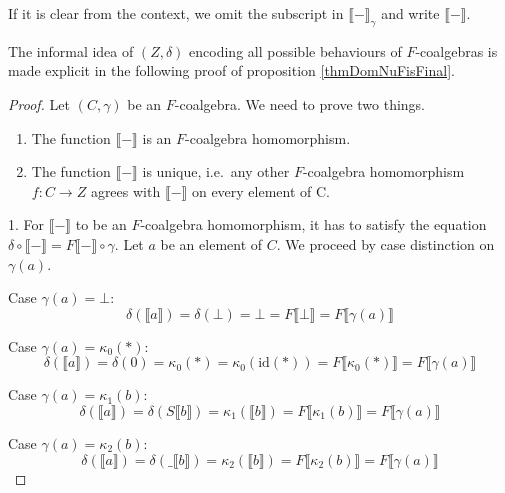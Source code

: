 \documentclass[a4paper]{article}
\newcommand{\arr}{\rightarrow}
\newcommand{\semantics}[1]{\llbracket #1 \rrbracket}
\begin{document}
If it is clear from the context, we omit the subscript in
$\semantics{-}_{\gamma}$ and write $\semantics{-}$.


The informal idea of $(Z, \delta)$ encoding all possible behaviours of
$F$-coalgebras is made explicit in the following proof of proposition
\ref{thmDomNuFisFinal}.

\begin{proof}

Let $(C, \gamma)$ be an $F$-coalgebra. We need to prove two things.

  \begin{enumerate}
  \item
    The function $\semantics{-}$ is an $F$-coalgebra homomorphism.
  \item
    The function $\semantics{-}$ is unique, i.e.~any other $F$-coalgebra
    homomorphism $f : C \arr Z$ agrees with $\semantics{-}$ on every element of C.
  \end{enumerate}

1. For $\semantics{-}$ to be an
$F$-coalgebra homomorphism, it has to satisfy the equation $\delta \circ
\semantics{-} = F\semantics{-} \circ \gamma$.  Let $a$ be an element of $C$. We
proceed by case distinction on $\gamma(a)$.

Case $\gamma(a) = \bot$:
\begin{equation*}
\delta(\semantics{a}) = \delta(\bot) = \bot =
F\semantics{\bot} = F\semantics{\gamma(a)}
\end{equation*}

Case $\gamma(a) = \kappa_0(*)$:
\begin{equation*}
\delta(\semantics{a}) = \delta(0) = \kappa_0(*)
= \kappa_0(\text{id}(*)) = F\semantics{\kappa_0(*)} = F\semantics{\gamma(a)}
\end{equation*}

Case $\gamma(a) = \kappa_1(b)$:
\begin{equation*}
\delta(\semantics{a}) = \delta(S \semantics{b}) = \kappa_1(\semantics{b}) =
F\semantics{\kappa_1(b)} = F\semantics{\gamma(a)}
\end{equation*}

Case $\gamma(a) = \kappa_2(b)$:
\begin{equation*}
\delta(\semantics{a}) = \delta(\_ \semantics{b}) = \kappa_2(\semantics{b}) =
F\semantics{\kappa_2(b)} = F\semantics{\gamma(a)}
\end{equation*}

\end{proof}
\end{document}
